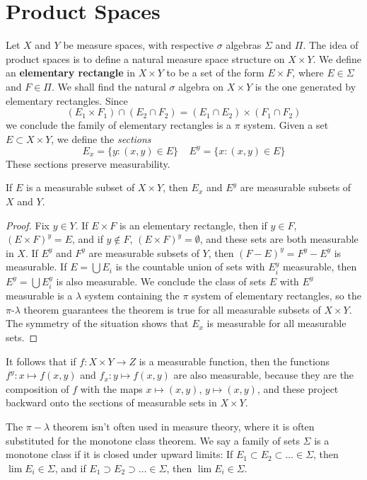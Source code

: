 \section{Product Spaces}

Let $X$ and $Y$ be measure spaces, with respective $\sigma$ algebras $\Sigma$ and $\Pi$. The idea of product spaces is to define a natural measure space structure on $X \times Y$. We define an {\bf elementary rectangle} in $X \times Y$ to be a set of the form $E \times F$, where $E \in \Sigma$ and $F \in \Pi$. We shall find the natural $\sigma$ algebra on $X \times Y$ is the one generated by elementary rectangles. Since
%
\[ (E_1 \times F_1) \cap (E_2 \cap F_2) = (E_1 \cap E_2) \times (F_1 \cap F_2) \]
%
we conclude the family of elementary rectangles is a $\pi$ system. Given a set $E \subset X \times Y$, we define the {\it sections}
%
\[ E_x = \{ y: (x,y) \in E \}\ \ \ \ \ E^y = \{ x: (x,y) \in E \} \]
%
These sections preserve measurability.

\begin{lemma}
    If $E$ is a measurable subset of $X \times Y$, then $E_x$ and $E^y$ are measurable subsets of $X$ and $Y$.
\end{lemma}
\begin{proof}
    Fix $y \in Y$. If $E \times F$ is an elementary rectangle, then if $y \in F$, $(E \times F)^y = E$, and if $y \not \in F$, $(E \times F)^y = \emptyset$, and these sets are both measurable in $X$. If $E^y$ and $F^y$ are measurable subsets of $Y$, then $(F - E)^y = F^y - E^y$ is measurable. If $E = \bigcup E_i$ is the countable union of sets with $E_i^y$ measurable, then $E^y = \bigcup E_i^y$ is also measurable. We conclude the class of sets $E$ with $E^y$ measurable is a $\lambda$ system containing the $\pi$ system of elementary rectangles, so the $\pi$-$\lambda$ theorem guarantees the theorem is true for all measurable subsets of $X \times Y$. The symmetry of the situation shows that $E_x$ is measurable for all measurable sets.
\end{proof}

It follows that if $f: X \times Y \to Z$ is a measurable function, then the functions $f^y: x \mapsto f(x,y)$ and $f_x: y \mapsto f(x,y)$ are also measurable, because they are the composition of $f$ with the maps $x \mapsto (x,y)$, $y \mapsto (x,y)$, and these project backward onto the sections of measurable sets in $X \times Y$.

The $\pi-\lambda$ theorem isn't often used in measure theory, where it is often substituted for the monotone class theorem. We say a family of sets $\Sigma$ is a monotone class if it is closed under upward limits: If $E_1 \subset E_2 \subset \dots \in \Sigma$, then $\lim E_i \in \Sigma$, and if $E_1 \supset E_2 \supset \dots \in \Sigma$, then $\lim E_i \in \Sigma$.

